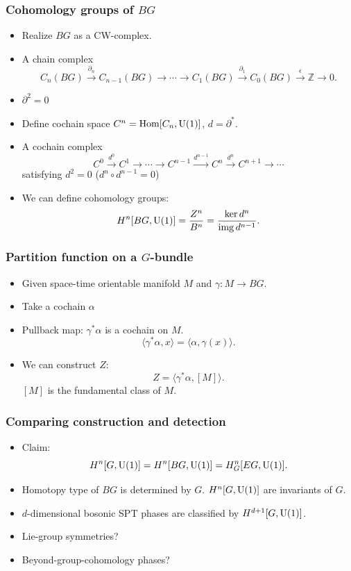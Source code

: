 \documentclass[xcolor=table, aspectratio=43,ignorenonframetext]{beamer}
\DeclareMathOperator{\img}{img}
\DeclareMathOperator{\hhom}{Hom}
\newcommand{\uone}{\text U(1)}
\begin{document}
\begin{frame}
	\frametitle{Cohomology groups of $BG$}
	\begin{itemize}
		\item Realize $BG$ as a CW-complex.
		\item A chain complex
		\[C_n(BG)\xrightarrow{\partial_n}
		C_{n-1}(BG)\rightarrow\cdots\rightarrow
		C_1(BG)\xrightarrow{\partial_1}
		C_0(BG)\xrightarrow{\epsilon}\mathbb Z\rightarrow0.\]
		\item $\partial^2=0$
		\item Define cochain space $C^n=\hhom[C_n,\text U(1)]$, $d = \partial^\ast$.
		\item A cochain complex
		\[C^0\xrightarrow{d^0}C^1\rightarrow\cdots\rightarrow C^{n-1}\xrightarrow{d^{n-1}}C^n\xrightarrow{d^n}C^{n+1}\rightarrow\cdots\]
		satisfying $d^2=0$ ($d^n\circ d^{n-1}=0$)
		\item We can define cohomology groups:
		\[H^n[BG,\text U(1)] = \frac{Z^n}{B^n} = \frac{\ker d^n}{\img d^{n-1}}.\]
	\end{itemize}
\end{frame}

\begin{frame}
	\frametitle{Partition function on a $G$-bundle}
	\begin{itemize}
		\item Given space-time orientable manifold $M$ and $\gamma:M\rightarrow BG$.
		\item Take a cochain $\alpha$
		\item Pullback map: $\gamma^\ast\alpha$ is a cochain on $M$.
		\[\langle \gamma^\ast\alpha, x\rangle = \langle \alpha,\gamma(x)\rangle.\]
		\item We can construct $Z$:
		\[Z = \langle\gamma^\ast\alpha, [M]\rangle.\]
		$[M]$ is the fundamental class of $M$.
	\end{itemize}
\end{frame}

\begin{frame}
	\frametitle{Comparing construction and detection}
	\begin{itemize}
		\item Claim:
		\[H^n[G, \uone] = H^n[BG, \uone] = H^n_G[EG, \uone].\]
		\item Homotopy type of $BG$ is determined by $G$. $H^n[G, \uone]$ are invariants of $G$.
		\item $d$-dimensional bosonic SPT phases are classified by
		$H^{d+1}[G, \uone]$.
		\item Lie-group symmetries?
		\item Beyond-group-cohomology phases?
	\end{itemize}
\end{frame}
\end{document}
